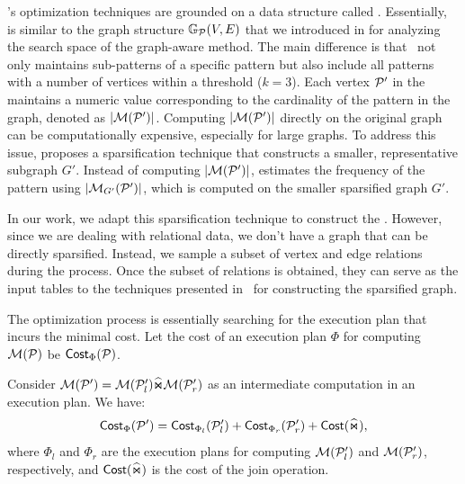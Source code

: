  \glogs's optimization techniques are grounded on a data structure called \glogue. Essentially, \glogue~ is similar to the graph structure $\mathbb{G}_{\mathcal{P}}(V, E)$ that we introduced in  for analyzing the search space of the graph-aware method. The main difference is that \glogue~not only maintains sub-patterns of a specific pattern but also include all patterns with a number of vertices within a threshold ($k=3$). Each vertex $\mathcal{P}'$ in the \glogue~ maintains a numeric value corresponding to the cardinality of the pattern in the graph, denoted as $|\mathcal{M}(\mathcal{P}')|$. Computing $|\mathcal{M}(\mathcal{P}')|$ directly on the original graph can be computationally expensive, especially for large graphs. To address this issue, \glogs proposes a sparsification technique that constructs a smaller, representative subgraph $G'$. Instead of computing $|\mathcal{M}(\mathcal{P}')|$, \glogs estimates the frequency of the pattern using $|\mathcal{M}_{G'}(\mathcal{P}')|$, which is computed on the smaller sparsified graph $G'$.

In our work, we adapt this sparsification technique to construct the \glogue. However, since we are dealing with relational data, we don't have a graph that can be directly sparsified. Instead, we sample a subset of vertex and edge relations during the \rgmapping process. Once the subset of relations is obtained, they can serve as the input tables to the techniques presented in~\cite{gart} for constructing the sparsified graph.

 The optimization process is essentially searching for the execution plan that incurs the minimal cost. Let the cost of an execution plan $\Phi$ for computing $\mathcal{M}(\mathcal{P})$ be ${\mathsf{Cost}}_\Phi(\mathcal{P})$. %

Consider $\mathcal{M}(\mathcal{P}') = \mathcal{M}(\mathcal{P}'_l) \widehat{\Join} \mathcal{M}(\mathcal{P}'_r)$ as an intermediate computation in an execution plan. We have:
\[
{\mathsf{Cost}}_{\Phi}(\mathcal{P}') = {\mathsf{Cost}}_{\Phi_l}(\mathcal{P}'_l) + {\mathsf{Cost}}_{\Phi_r}(\mathcal{P}'_r) + {\mathsf{Cost}}(\widehat{\Join}),
\]
where $\Phi_l$ and $\Phi_r$ are the execution plans for computing $\mathcal{M}(\mathcal{P}'_l)$ and $\mathcal{M}(\mathcal{P}'_r)$, respectively, and ${\mathsf{Cost}}(\widehat{\Join})$ is the cost of the join operation.

